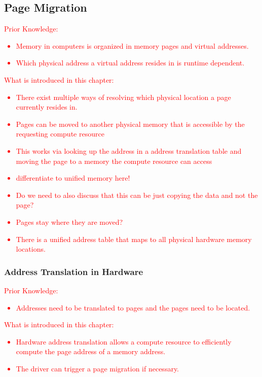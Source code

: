 \documentclass[a4paper,10pt]{scrartcl}
\newcommand\gist[1]{\textcolor{red}{#1}}
\begin{document}
\subsection{Page Migration}
\gist{
  Prior Knowledge:
\begin{itemize}
\item Memory in computers is organized in memory pages and virtual addresses.
\item Which physical address a virtual address resides in is runtime dependent.
\end{itemize}
  What is introduced in this chapter:
\begin{itemize}
\item There exist multiple ways of resolving which physical location a page currently resides in.
\item Pages can be moved to another physical memory that is accessible by the requesting compute resource
\item This works via looking up the address in a address translation table and moving the page to a memory the compute resource can access
\item differentiate to unified memory here!
\item Do we need to also discuss that this can be just copying the data and not the page?
\item Pages stay where they are moved?
\item There is a unified address table that maps to all physical hardware memory locations.
\end{itemize}
}

\subsubsection{Address Translation in Hardware}
\gist{
  Prior Knowledge:
\begin{itemize}
\item Addresses need to be translated to pages and the pages need to be located.
\end{itemize}
  What is introduced in this chapter:
\begin{itemize}
\item Hardware address translation allows a compute resource to efficiently compute the page address of a memory address.
\item The driver can trigger a page migration if necessary.
\end{itemize}
}
\end{document}
